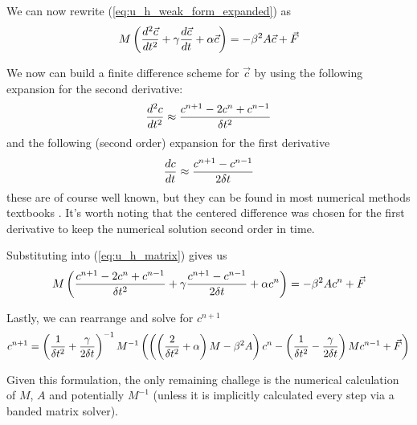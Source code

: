 We can now rewrite (\ref{eq:u_h_weak_form_expanded}) as
\begin{equation} \label{eq:u_h_matrix}
M\left( \frac{d^2 \vec{c}}{d t^2} + \gamma\frac{d \vec{c}}{d t} + \alpha \vec{c} \right) = - \beta^2 A \vec{c} + \vec{F}
\end{equation}

We now can build a finite difference scheme for $\vec{c}$ by using the following expansion for the second derivative:
\begin{equation} \label{eq:second_derivative_finite_difference}
\frac{d^2 c}{d t^2} \approx \frac{c^{n+1} - 2c^n + c^{n-1}}{\delta t^2}
\end{equation}
and the following (second order) expansion for the first derivative
\begin{equation} \label{eq:first_derivative_finite_difference}
\frac{d c}{d t} \approx \frac{c^{n+1} - c^{n-1}}{2\delta t}
\end{equation}
these are of course well known, but they can be found in most numerical methods textbooks \cite{difference_formulas}.
It's worth noting that the centered difference was chosen for the first derivative to keep the numerical solution second
order in time.

Substituting into (\ref{eq:u_h_matrix}) gives us
\begin{equation} \label{eq:finite_diff_weak_form}
M \left( \frac{c^{n+1} - 2c^n + c^{n-1}}{\delta t^2} + \gamma \frac{c^{n+1} - c^{n-1}}{2\delta t} + \alpha c^n \right) = - \beta^2 A c^n + \vec{F}
\end{equation}

Lastly, we can rearrange and solve for $c^{n+1}$
\begin{equation} \label{eq:finite_diff_solution}
c^{n+1} = \left( \frac{1}{\delta t^2} + \frac{\gamma}{2\delta t} \right)^{-1} M^{-1}
\left(
\left( \left(\frac{2}{\delta t^2} + \alpha\right) M - \beta^2 A \right) c^n
-
\left( \frac{1}{\delta t^2} - \frac{\gamma}{2\delta t} \right) M c^{n-1}
+
\vec{F}
\right)
\end{equation}

Given this formulation, the only remaining challege is the numerical calculation of $M$, $A$ and potentially
$M^{-1}$ (unless it is implicitly calculated every step via a banded matrix solver).
